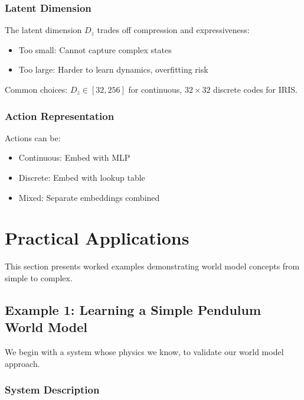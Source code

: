 \subsubsection{Latent Dimension}

The latent dimension $D_z$ trades off compression and expressiveness:
\begin{itemize}
    \item Too small: Cannot capture complex states
    \item Too large: Harder to learn dynamics, overfitting risk
\end{itemize}

Common choices: $D_z \in [32, 256]$ for continuous, $32 \times 32$ discrete codes for IRIS.

\subsubsection{Action Representation}

Actions can be:
\begin{itemize}
    \item Continuous: Embed with MLP
    \item Discrete: Embed with lookup table
    \item Mixed: Separate embeddings combined
\end{itemize}

\section{Practical Applications}
\label{sec:world_model_applications}

This section presents worked examples demonstrating world model concepts from simple to complex.

\subsection{Example 1: Learning a Simple Pendulum World Model}

We begin with a system whose physics we know, to validate our world model approach.

\subsubsection{System Description}

